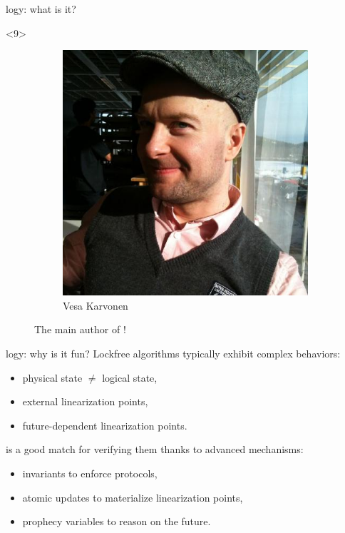 \begin{frame}{\Zoo[]logy: what is it?}
\begin{overbox}<9>
    \begin{figure}
        \begin{subfigure}{0.4\textwidth}
            \includegraphics[scale=0.2]{images/vesa_karvonen.jpg}
            \caption*{\footnotesize Vesa Karvonen}
        \end{subfigure}
        \caption*{The main author of \Kcas!}
    \end{figure}
\end{overbox}
\end{frame}

\begin{frame}{\Zoo[]logy: why is it fun?}
Lockfree algorithms typically exhibit complex behaviors:
\begin{itemize}
    \item physical state $\neq$ logical state,
    \item external linearization points,
    \item future-dependent linearization points.
\end{itemize}
\vfill
\Iris is a good match for verifying them thanks to advanced mechanisms:
\begin{itemize}
    \item invariants to enforce protocols,
    \item atomic updates to materialize linearization points,
    \item prophecy variables to reason on the future.
\end{itemize}
\end{frame}